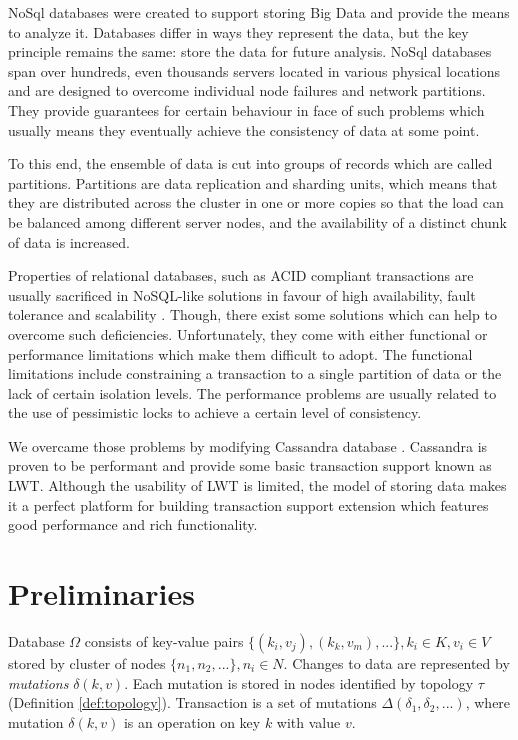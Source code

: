 \documentclass[runningheads,a4paper]{llncs}
\newcommand{\mutation}[2]{$\delta(#1, #2)$\xspace}
\begin{document}
NoSql databases were created to support storing Big Data and provide the means
to analyze it.  Databases differ in ways they represent the data, but the key
principle remains the same:  store the data for future analysis. NoSql databases
span over hundreds, even thousands servers  located in various physical
locations and are designed to overcome individual node  failures and network
partitions. They provide guarantees for certain behaviour in face of such
problems which usually means they eventually achieve the consistency of data at
some point.

To this end, the ensemble of data is cut into groups of records which are called
partitions.  Partitions are data replication and sharding units, which means
that they are distributed across  the cluster in one or more copies so that the
load can be balanced among different server nodes, and the availability of a
distinct chunk of data is increased.

Properties of relational databases, such as ACID compliant transactions are
usually sacrificed in NoSQL-like solutions in favour of high availability, fault
tolerance and scalability \cite{StonebrakerSqlVsNosql}. Though,  there exist some solutions which can help to
overcome such deficiencies. Unfortunately, they come with either functional or
performance limitations which make them difficult to adopt.  The functional
limitations include constraining a transaction to a single partition of data or
the lack of certain isolation levels. The performance problems are usually
related to the use of pessimistic locks to achieve a certain level of
consistency.

We overcame those problems by modifying Cassandra database \cite{lakshman2010cassandra}. Cassandra is proven
to be performant  and provide some basic transaction support known as LWT.
Although the usability of LWT is limited, the model of storing data makes it a
perfect platform for building transaction support extension which features good
performance and rich functionality.

\section{Preliminaries}

Database $\Omega$ consists of key-value pairs $\{(k_{i},v_{j}), (k_{k},v_{m}),...\}, k_i\in\mathit{K}, v_i\in\mathit{V}$ stored by cluster of nodes $\{n_1, n_2, ...\}, n_i\in\mathit{N}$.
Changes to data are represented by \emph{mutations} $\delta(k,v)$. 
Each mutation is stored in nodes identified by topology $\tau$ (Definition \ref{def:topology}).
Transaction is a set of mutations $\Delta(\delta_{1}, \delta_{2}, ...)$, where mutation \mutation{k}{v} is an operation
on key $k$ with value $v$.
\end{document}
